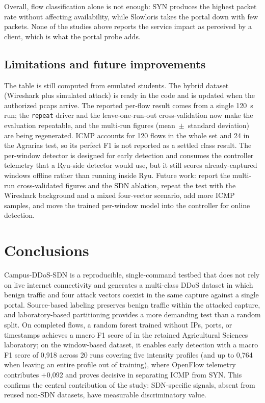 \documentclass[ASNA,twocolumn]{USG}
\begin{document}
  Overall, flow classification alone is not enough: SYN produces the highest packet rate without affecting availability, while Slowloris takes the portal down with few packets. None of the studies above reports the service impact as perceived by a client, which is what the portal probe adds.

  \subsection{Limitations and future improvements}
  The table is still computed from emulated students. The hybrid dataset (Wireshark plus simulated attack) is ready in the code and is updated when the authorized pcaps arrive. The reported per-flow result comes from a single 120~s run; the \texttt{repeat} driver and the leave-one-run-out cross-validation now make the evaluation repeatable, and the multi-run figures (mean~$\pm$~standard deviation) are being regenerated. ICMP accounts for 120 flows in the whole set and 24 in the Agrarias test, so its perfect F1 is not reported as a settled class result. The per-window detector is designed for early detection and consumes the controller telemetry that a Ryu-side detector would use, but it still scores already-captured windows offline rather than running inside Ryu. Future work: report the multi-run cross-validated figures and the SDN ablation, repeat the test with the Wireshark background and a mixed four-vector scenario, add more ICMP samples, and move the trained per-window model into the controller for online detection.

  \section{Conclusions}
  Campus-DDoS-SDN is a reproducible, single-command testbed that does not rely on live internet connectivity and generates a multi-class DDoS dataset in which benign traffic and four attack vectors coexist in the same capture against a single portal. Source-based labeling preserves benign traffic within the attacked capture, and laboratory-based partitioning provides a more demanding test than a random split. On completed flows, a random forest trained without IPs, ports, or timestamps achieves a macro F1 score of \Fmacro in the retained Agricultural Sciences laboratory; on the window-based dataset, it enables early detection with a macro F1 score of 0{,}918 across 20 runs covering five intensity profiles (and up to 0{,}764 when leaving an entire profile out of training), where OpenFlow telemetry contributes $+$0{,}092 and proves decisive in separating ICMP from SYN. This confirms the central contribution of the study: SDN-specific signals, absent from reused non-SDN datasets, have measurable discriminatory value.
\end{document}
